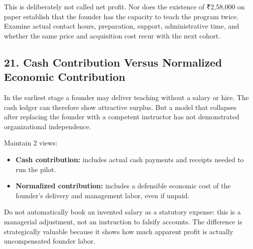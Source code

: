 This is deliberately not called net profit. Nor does the existence of ₹2,58,000 on paper establish that the founder has the capacity to teach the program twice. Examine actual contact hours, preparation, support, administrative time, and whether the same price and acquisition cost recur with the next cohort.

\subsection*{21. Cash Contribution Versus Normalized Economic Contribution}

In the earliest stage a founder may deliver teaching without a salary or hire. The cash ledger can therefore show attractive surplus. But a model that collapses after replacing the founder with a competent instructor has not demonstrated organizational independence.

Maintain 2 views:
\begin{itemize}
  \item \textbf{Cash contribution:} includes actual cash payments and receipts needed to run the pilot.
  \item \textbf{Normalized contribution:} includes a defensible economic cost of the founder's delivery and management labor, even if unpaid.
\end{itemize}
Do not automatically book an invented salary as a statutory expense: this is a managerial adjustment, not an instruction to falsify accounts. The difference is strategically valuable because it shows how much apparent profit is actually uncompensated founder labor.
